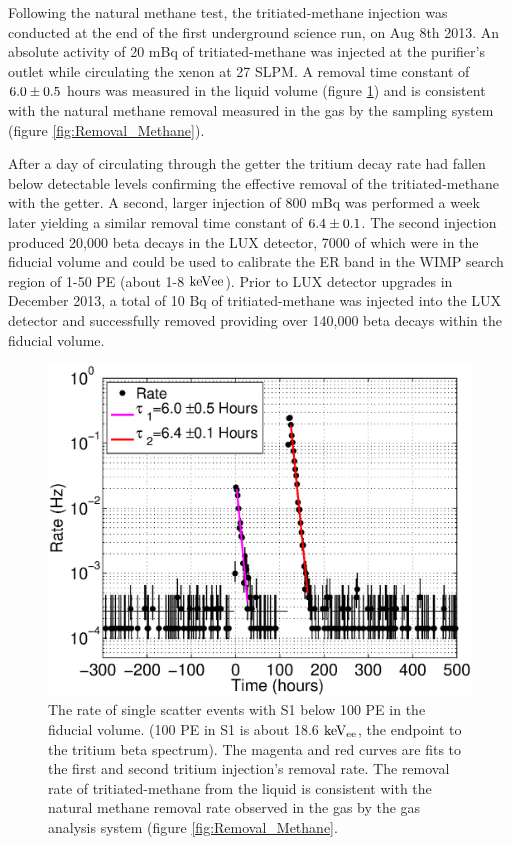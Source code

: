 Following the natural methane test, the tritiated-methane injection was conducted at the end of the first underground science run, on Aug 8th 2013. An absolute activity of 20 mBq of tritiated-methane was injected at the purifier's outlet while circulating the xenon at 27 SLPM. A removal time constant of $\rm 6.0 \pm 0.5$ hours was measured in the liquid volume (figure \ref{fig:Removal}) and is consistent with the natural methane removal measured in the gas by the sampling system (figure \ref{fig:Removal_Methane}). 

After a day of circulating through the getter the tritium decay rate had fallen below detectable levels confirming the effective removal of the tritiated-methane with the getter. A second, larger injection of 800 mBq was performed a week later yielding a similar removal time constant of $\rm 6.4 \pm 0.1$. The second injection produced 20,000 beta decays in the LUX detector, 7000 of which were in the fiducial volume and could be used to calibrate the ER band in the WIMP search region of 1-50 PE (about 1-8 $\rm keV{ee}$). Prior to LUX detector upgrades in December 2013, a total of 10 Bq of tritiated-methane was injected into the LUX detector and successfully removed providing over 140,000 beta decays within the fiducial volume. 

\renewcommand{\baselinestretch}{1}
\small\normalsize
\begin{figure}[h!]\centering
\includegraphics[width=120mm]{Chapter_T/Figures/CH3T_Rate_fid_150_Run03_Tritium_Rate.eps}
\caption{ The rate of single scatter events with S1 below 100 PE in the fiducial volume. (100 PE in S1 is about 18.6 $\rm keV_{ee}$, the endpoint to the tritium beta spectrum). The magenta and red curves are fits to the first and second tritium injection's removal rate. The removal rate of tritiated-methane from the liquid is consistent with the natural methane removal rate observed in the gas by the gas analysis system (figure \ref{fig:Removal_Methane}.}
\label{fig:Removal}
\end{figure}
\renewcommand{\baselinestretch}{2}
\small\normalsize



